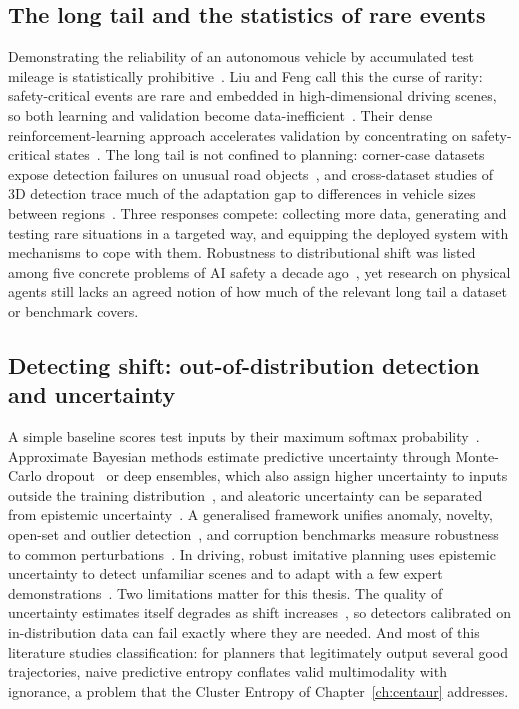 \subsection{The long tail and the statistics of rare events}

Demonstrating the reliability of an autonomous vehicle by accumulated test mileage is statistically prohibitive~\cite{kalra2016driving}. Liu and Feng call this the curse of rarity: safety-critical events are rare and embedded in high-dimensional driving scenes, so both learning and validation become data-inefficient~\cite{liu2024curse}. Their dense reinforcement-learning approach accelerates validation by concentrating on safety-critical states~\cite{feng2023dense}. The long tail is not confined to planning: corner-case datasets expose detection failures on unusual road objects~\cite{li2022coda}, and cross-dataset studies of 3D detection trace much of the adaptation gap to differences in vehicle sizes between regions~\cite{wang2020train}. Three responses compete: collecting more data, generating and testing rare situations in a targeted way, and equipping the deployed system with mechanisms to cope with them. Robustness to distributional shift was listed among five concrete problems of AI safety a decade ago~\cite{amodei2016concrete}, yet research on physical agents still lacks an agreed notion of how much of the relevant long tail a dataset or benchmark covers.

\subsection{Detecting shift: out-of-distribution detection and uncertainty}

A simple baseline scores test inputs by their maximum softmax probability~\cite{hendrycks2017baseline}. Approximate Bayesian methods estimate predictive uncertainty through Monte-Carlo dropout~\cite{gal2016dropout} or deep ensembles, which also assign higher uncertainty to inputs outside the training distribution~\cite{lakshminarayanan2017simple}, and aleatoric uncertainty can be separated from epistemic uncertainty~\cite{kendall2017uncertainties}. A generalised framework unifies anomaly, novelty, open-set and outlier detection~\cite{yang2024generalized}, and corruption benchmarks measure robustness to common perturbations~\cite{hendrycks2019benchmarking}. In driving, robust imitative planning uses epistemic uncertainty to detect unfamiliar scenes and to adapt with a few expert demonstrations~\cite{filos2020can}. Two limitations matter for this thesis. The quality of uncertainty estimates itself degrades as shift increases~\cite{ovadia2019can}, so detectors calibrated on in-distribution data can fail exactly where they are needed. And most of this literature studies classification: for planners that legitimately output several good trajectories, naive predictive entropy conflates valid multimodality with ignorance, a problem that the Cluster Entropy of Chapter~\ref{ch:centaur} addresses.

